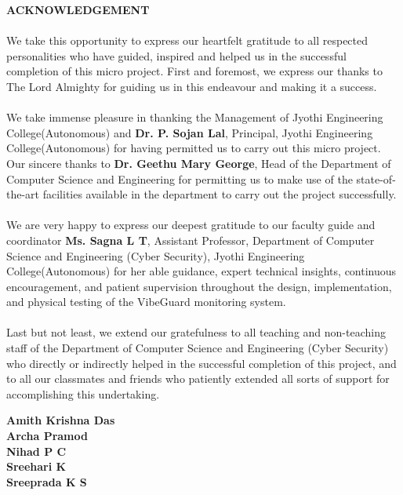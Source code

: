 \begin{center}
\textbf{\fontsize{16}{32}\selectfont ACKNOWLEDGEMENT}\\
\end{center}
\fontsize{12}{22}\selectfont
\paragraph*{}We take this opportunity to express our heartfelt gratitude to all respected personalities who have guided, inspired and helped us in the successful completion of this micro project. First and foremost, we express our thanks to The Lord Almighty for guiding us in this endeavour and making it a success.

\paragraph*{}We take immense pleasure in thanking the Management of Jyothi Engineering College(Autonomous) and \textbf{Dr. P. Sojan Lal}, Principal, Jyothi Engineering College(Autonomous) for having permitted us to carry out this micro project. Our sincere thanks to \textbf{Dr. Geethu Mary George}, Head of the Department of Computer Science and Engineering for permitting us to make use of the state-of-the-art facilities available in the department to carry out the project successfully.

\paragraph*{}We are very happy to express our deepest gratitude to our faculty guide and coordinator \textbf{Ms. Sagna L T}, Assistant Professor, Department of Computer Science and Engineering (Cyber Security), Jyothi Engineering College(Autonomous) for her able guidance, expert technical insights, continuous encouragement, and patient supervision throughout the design, implementation, and physical testing of the VibeGuard monitoring system.

\paragraph*{}Last but not least, we extend our gratefulness to all teaching and non-teaching staff of the Department of Computer Science and Engineering (Cyber Security) who directly or indirectly helped in the successful completion of this project, and to all our classmates and friends who patiently extended all sorts of support for accomplishing this undertaking.

\vspace{1.5em}
\begin{flushright}
\textbf{Amith Krishna Das} \\
\textbf{Archa Pramod} \\
\textbf{Nihad P C} \\
\textbf{Sreehari K} \\
\textbf{Sreeprada K S} \\
\end{flushright}
\clearpage
